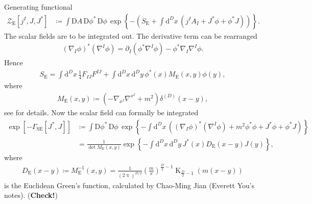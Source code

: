 \documentclass[12pt]{article}
\newcommand\pp{\uppi}
\newcommand\dif{\mathrm{d}}
\newcommand\Dif{\mathrm{D}}
\DeclareMathOperator{\BesselK}{K}
\newcommand{\rbr}[1]{{\left(#1\right)}}
\newcommand{\rfun}[2]{{#1}\mathopen{}\left(#2\right)\mathclose{}}
\newcommand{\sfun}[2]{{#1}\mathopen{}\left[#2\right]\mathclose{}}
\newcommand{\cfun}[2]{{#1}\mathopen{}\left\{#2\right\}\mathclose{}}
\begin{document}
Generating functional
\begin{align}
\sfun{\mathcal{Z}_\text{E}}{j^I, J, J^*} &\coloneqq
\int\Dif A\,\Dif\phi^*\,\Dif\phi\,\cfun{\exp}{-\rbr{S_\text{E}
+\int\dif^{D} x\,\rbr{j^I A_I + J^* \phi+\phi^* J}}}.
\end{align}
The scalar fields are to be integrated out. The derivative term can be 
rearranged
\begin{align}
\rbr{\nabla_{\! I} \phi}^* \rbr{\nabla^{I} \phi} = \partial_I\rbr{\phi^* 
\nabla^{I}\phi} - \phi^* \nabla_{\! I} \nabla^{I} \phi.
\end{align}
Hence
\begin{align}
S_\text{E} = \int \dif^D x\, \frac{1}{4} F_{IJ} F^{IJ} +
	\int \dif^D x\,\dif^D y\,
	\rfun{\phi^*}{x} \rfun{M_\text{E}}{x,y} \rfun{\phi}{y},
\end{align}
where
\begin{align}
\rfun{M_\text{E}}{x,y} \coloneqq \rbr{-\nabla_{\! x^I} \nabla^{x^I} + m^2} 
\rfun{\delta^{(D)}}{x-y},
\end{align}
see \cite[ch.\ 6]{mosel2004} for details. Now the scalar field can formally be 
integrated
\begin{align}
\sfun{\exp}{-\sfun{\varGamma_\text{SE}}{J^*, J}} &\coloneqq \int 
	\Dif\phi^*\,\Dif\phi\, \cfun{\exp}{-\int\dif^{D} x\, \rbr{
	\rbr{\nabla_{\! I} \phi}^* \rbr{\nabla^{I} \phi} + m^2 \phi^* \phi 
	+ J^* \phi + \phi^* J}}
\nonumber \\
&= \frac{1}{\det \rfun{M_{\text{E}}}{x,y}}
	\cfun{\exp}{-\int\dif^D x\,\dif^D y\,
		\rfun{J^*}{x}\rfun{D_\text{E}}{x-y} \rfun{J}{y} },
\end{align}
where
\begin{align}
\rfun{D_\text{E}}{x-y} \coloneqq \rfun{M_\text{E}^{-1}}{x,y} = 
	\frac{1}{\rbr{2\pp}^{D/2}} \rbr{\frac{m}{x}}^{\frac{D}{2}-1}
	\rfun{\BesselK_{\frac{D}{2}-1}}{m\rbr{x-y}}
\end{align}
is the Euclidean Green's function, calculated by Chao-Ming Jian (Everett You's 
notes). (\textbf{Check!})
\end{document}
